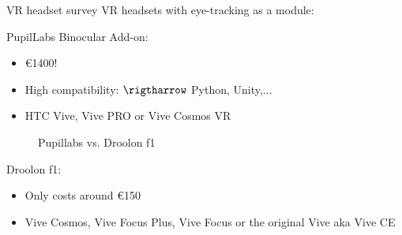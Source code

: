 \documentclass{beamer}
\begin{document}

\begin{frame}{VR headset survey}
	VR headsets with eye-tracking as a module:
	\vspace{0.5cm}
	
	PupilLabs Binocular Add-on:
	\begin{itemize}
		\item €1400!
		\item High compatibility: $\rigtharrow$ Python, Unity,...
		\item HTC Vive, Vive PRO or Vive Cosmos VR
    \end{itemize} 
	
\begin{figure}
	\centering
	\qquad
	\caption{Pupillabs vs. Droolon f1}%
	\label{fig:example}%
\end{figure}

	Droolon f1:
	\begin{itemize}
		\item Only costs around €150
		\item Vive Cosmos, Vive Focus Plus, Vive Focus or the original Vive aka Vive CE
	\end{itemize}
\end{frame}
\end{document}
